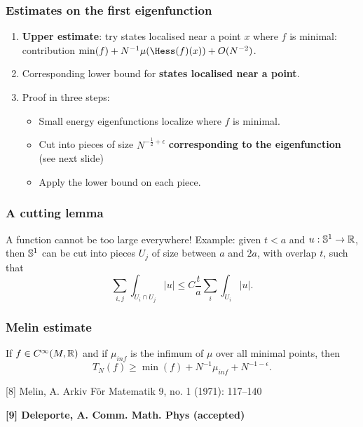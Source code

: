 \documentclass[mathserif]{beamer}
\begin{document}
\begin{frame}
  \frametitle{Estimates on the first eigenfunction}
  \begin{enumerate}
  \item<1-> {\bf Upper estimate}: try states localised near a point
    $x$ where $f$ is minimal:
    contribution $\min(f)+N^{-1}\mu(\Hess(f)(x))+O(N^{-2})$.
  \item<2-> Corresponding lower bound for {\bf states localised near a
      point}.
  \item<3-> Proof in three steps:
    \begin{itemize}
    \item Small energy eigenfunctions localize where $f$ is minimal.
    \item Cut into pieces of size $N^{-\frac 12+\epsilon}$ {\bf
        corresponding to the eigenfunction} (see next slide)
      \item Apply the lower bound on each piece.
    \end{itemize}

  \end{enumerate}
\end{frame}
\begin{frame}
  \frametitle{A cutting lemma}
  A function cannot be too large everywhere!
\vfill 
  Example: given $t<a$ and $u:\S^1\to \R$, then $\S^1$ can be cut into pieces $U_j$ of size
  between $a$ and $2a$, with overlap $t$, such that
  \[
    \sum_{i,j}\int_{U_i\cap U_j}|u|\leq
    C\frac{t}{a}\sum_i\int_{U_i}|u|.
    \]
  \end{frame}

  \begin{frame}
\frametitle{Melin estimate}
\begin{theorem}
    If $f\in C^{\infty}(M,\R)$ and if $\mu_{inf}$ is the infimum of $\mu$ over all
    minimal points, then $$T_N(f)\geq \min(f)+N^{-1}\mu_{inf}+N^{-1-\epsilon}.$$
  \end{theorem}
  
\vspace{7em}
\small{
  [8] Melin, A. Arkiv För Matematik 9, no. 1 (1971): 117–140
  
{\bf [9] Deleporte, A. Comm. Math. Phys (accepted)}
}

\end{frame}
\end{document}
